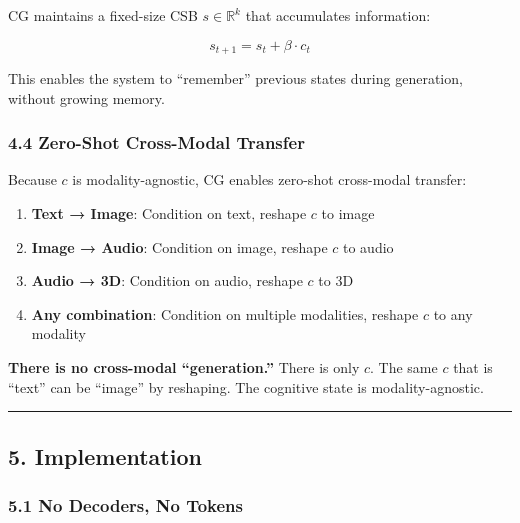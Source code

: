 \documentclass[
  11pt,
  a4paper,
]{article}
\providecommand{\tightlist}{%
  \setlength{\itemsep}{0pt}\setlength{\parskip}{0pt}}
\begin{document}
CG maintains a fixed-size CSB \(s \in \mathbb{R}^k\) that accumulates
information:

\[
s_{t+1} = s_t + \beta \cdot c_t
\]

This enables the system to ``remember'' previous states during
generation, without growing memory.

\subsubsection{4.4 Zero-Shot Cross-Modal
Transfer}\label{zero-shot-cross-modal-transfer}

Because \(c\) is modality-agnostic, CG enables zero-shot cross-modal
transfer:

\begin{enumerate}
\def\labelenumi{\arabic{enumi}.}
\tightlist
\item
  \textbf{Text → Image}: Condition on text, reshape \(c\) to image
\item
  \textbf{Image → Audio}: Condition on image, reshape \(c\) to audio
\item
  \textbf{Audio → 3D}: Condition on audio, reshape \(c\) to 3D
\item
  \textbf{Any combination}: Condition on multiple modalities, reshape
  \(c\) to any modality
\end{enumerate}

\textbf{There is no cross-modal ``generation.''} There is only \(c\).
The same \(c\) that is ``text'' can be ``image'' by reshaping. The
cognitive state is modality-agnostic.

\begin{center}\rule{0.5\linewidth}{0.5pt}\end{center}

\subsection{5. Implementation}\label{implementation}

\subsubsection{5.1 No Decoders, No Tokens}\label{no-decoders-no-tokens}
\end{document}
